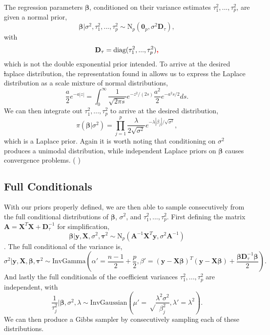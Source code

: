\documentclass{uwstat572}
\newcommand{\vmdel}[1]{\sout{#1}}
\newcommand{\vmadd}[1]{\textbf{\color{red}{#1}}}
\newcommand{\vmcomment}[1]{({\color{blue}{VM's comment:}} \textbf{\color{blue}{#1}})}
\begin{document}
The regression parameters $\boldsymbol\beta$, conditioned on their variance estimates $\tau_1^2,...,\tau_p^2$, are given a normal prior, \[ 
\boldsymbol\beta|\sigma^2,\tau^2_1,...,\tau^2_p\sim\text{N}_p(\mathbf{0}_p,\sigma^2\mathbf{D}_\tau),\] with \[ \mathbf{D}_\tau=\text{diag}(\tau_1^2,...,\tau^2_p)\vmadd{,}
 \] 
which is not the double exponential prior intended. To arrive at the desired \vmdel{l}\vmadd{L}aplace distribution, the representation found in \citep{andrews1974scale} allows us to express the Laplace distribution as a scale mixture of normal distributions, \[ \frac{a}{2}e^{-a|z|}=\int^\infty_0
\frac{1}{\sqrt{2\pi s}}e^{-z^2/(2s)}\frac{a^2}{2}e^{-a^2s/2}ds.\] We can then integrate out $\tau^2_1,...,\tau^2_p$ to arrive at the desired distribution, \[ \pi(\boldsymbol\beta|\sigma^2)=\prod^p_{j=1}\frac{\lambda}{2\sqrt{\sigma^2}}e^{-\lambda|\beta_j|/\sqrt{\sigma^2}}, \] which is a Laplace prior. Again it is worth noting that conditioning on $\sigma^2$ produces a unimodal distribution, while independent Laplace priors on $\boldsymbol\beta$ causes convergence problems.
\vmcomment{Again, I am not getting this. Conditional on $\sigma$, $\beta$s are independently distributed. What convergence problems do you have in mind, under what MCMC sampling strategy?}

\subsection{Full Conditionals}
With our priors properly defined, we are then able to sample consecutively from the full conditional distributions of $\boldsymbol\beta$, $\sigma^2$, and $\tau^2_1,...,\tau^2_p$. First defining the matrix $\mathbf{A}=\mathbf{X}^T\mathbf{X}+\mathbf{D}_\tau^{-1}$ for simplification, \[
\boldsymbol\beta|\mathbf{y},\mathbf{X},\sigma^2,\boldsymbol\tau^2 \sim \text{N}_p(\mathbf{A}^{-1}\mathbf{X}^T\mathbf{y},\sigma^2\mathbf{A}^{-1}) \]. The full conditional of the variance is, \[ \sigma^2|\mathbf{y},\mathbf{X},\boldsymbol\beta,\boldsymbol\tau^2 \sim \text{InvGamma}\left(\alpha'=\frac{n-1}{2}+\frac{p}{2},\beta'=(\mathbf{y}-\mathbf{X}\boldsymbol\beta)^T(\mathbf{y}-\mathbf{X}\boldsymbol\beta)+\frac{\boldsymbol\beta\mathbf{D}_\tau^{-1}\boldsymbol\beta}{2}\right). \] And lastly the full conditionals of the coefficient variances $\tau^2_1,...,\tau^2_p$ are independent, with \[
\frac{1}{\tau_j^2} | \boldsymbol\beta, \sigma^2, \lambda \sim \text{InvGaussian}\left(\mu'=\sqrt\frac{\lambda^2\sigma^2}{\beta_j^2}, \lambda'=\lambda^2\right). \] We can then produce a Gibbs sampler by consecutively sampling each of these distributions.
\end{document}

